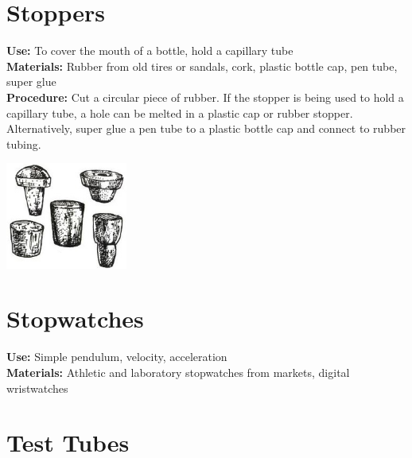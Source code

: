\begin{multicols}{2}
\columnbreak

\section{Stoppers}
\label{sec:stoppers}
\vspace{-10pt}
\textbf{Use:} To cover the mouth of a bottle, hold a capillary tube\\
\textbf{Materials:} Rubber from old tires or sandals, cork, plastic bottle cap, pen tube, super glue\\
\textbf{Procedure:} Cut a circular piece of rubber.  If the stopper is being used to hold a capillary tube, a hole can be melted in a plastic cap or rubber stopper. Alternatively, super glue a pen tube to a plastic bottle cap and connect to rubber tubing.
\begin{center}
\includegraphics[width=0.3\textwidth]{./img/source/stoppers.jpg}
\end{center}

\section{Stopwatches}
\label{sec:stopwatches}
\vspace{-10pt}
\textbf{Use:} Simple pendulum, velocity, acceleration\\
\textbf{Materials:} Athletic and laboratory stopwatches from markets, digital wristwatches

\section{Test Tubes}
\label{sec:testtubes}


\end{multicols}
